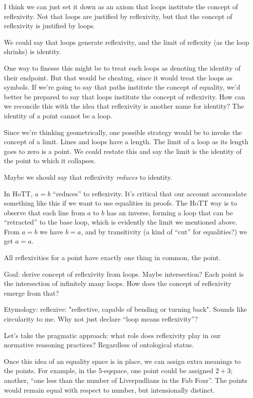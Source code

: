\documentclass{article}
\begin{document}
I think we can just set it down as an axiom that loops institute the
concept of reflexivity. Not that loops are justified by reflexivity,
but that the concept of reflexivity is justified by loops.

We could say that loops generate reflexivity, and the limit of
reflexity (as the loop shrinks) is identity.

One way to finesse this might be to treat such loops as denoting the
identity of their endpoint. But that would be cheating, since it would
treat the loops as symbols. If we're going to say that paths institute
the concept of equality, we'd better be prepared to say that loops
institute the concept of reflexivity. How can we reconcile this with
the idea that reflexivity is another name for identity? The identity
of a point cannot be a loop.

Since we're thinking geometrically, one possible strategy would be to
invoke the concept of a limit. Lines and loops have a length. The
limit of a loop as its length goes to zero is a point. We could
restate this and say the limit is the identity of the point to which
it collapses.

Maybe we should say that reflexivity \textit{reduces} to identity.

In HoTT, \(a=b\) ``reduces'' to reflexivity. It's critical that our
account accomodate something like this if we want to use equalities in
proofs. The HoTT way is to observe that each line from \(a\) to \(b\)
has an inverse, forming a loop that can be ``retracted'' to the base
loop, which is evidently the limit we mentioned above. From \(a=b\) we
have \(b=a\), and by transitivity (a kind of ``cut'' for equalities?)
we get \(a=a\).

All reflexivities for a point have exactly one thing in common, the
point.

Goal: derive concept of reflexivity from loops. Maybe intersection?
Each point is the intersection of infinitely many loops. How does the concept of reflexivity emerge from that?

Etymology: reflexive: "reflective, capable of bending or turning
back". Sounds like circularity to me. Why not just declare ``loop
means reflexivity''?

Let's take the pragmatic approach: what role does reflexivity play in
our normative reasoning practices? Regardless of ontological status.

Once this idea of an equality space is in place, we can assign extra
meanings to the points. For example, in the 5-eqspace, one point could
be assigned \(2+3\); another, ``one less than the number of
Liverpudlians in the Fab Four''. The points would remain equal with
respect to number, but intensionally distinct.
\end{document}
